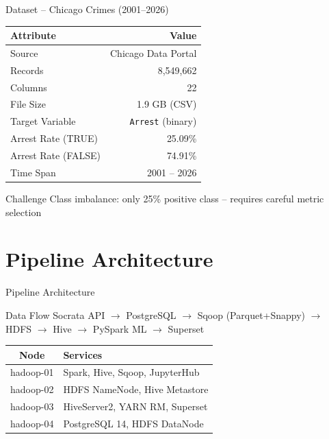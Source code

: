 \documentclass[10pt]{beamer}
\begin{document}
\begin{frame}{Dataset -- Chicago Crimes (2001--2026)}
\begin{table}
\centering
\begin{tabular}{lr}
\toprule
\textbf{Attribute} & \textbf{Value} \\
\midrule
Source & Chicago Data Portal \\
Records & 8,549,662 \\
Columns & 22 \\
File Size & 1.9 GB (CSV) \\
Target Variable & \texttt{Arrest} (binary) \\
Arrest Rate (TRUE) & 25.09\% \\
Arrest Rate (FALSE) & 74.91\% \\
Time Span & 2001 -- 2026 \\
\bottomrule
\end{tabular}
\end{table}

\begin{alertblock}{Challenge}
Class imbalance: only 25\% positive class -- requires careful metric selection
\end{alertblock}
\end{frame}

\section{Pipeline Architecture}

\begin{frame}{Pipeline Architecture}
\begin{block}{Data Flow}
Socrata API $\rightarrow$ PostgreSQL $\rightarrow$ Sqoop (Parquet+Snappy) $\rightarrow$ HDFS $\rightarrow$ Hive $\rightarrow$ PySpark ML $\rightarrow$ Superset
\end{block}

\vspace{0.3cm}

\begin{table}
\centering
\begin{tabular}{cl}
\toprule
\textbf{Node} & \textbf{Services} \\
\midrule
hadoop-01 & Spark, Hive, Sqoop, JupyterHub \\
hadoop-02 & HDFS NameNode, Hive Metastore \\
hadoop-03 & HiveServer2, YARN RM, Superset \\
hadoop-04 & PostgreSQL 14, HDFS DataNode \\
\bottomrule
\end{tabular}
\end{table}
\end{frame}
\end{document}

